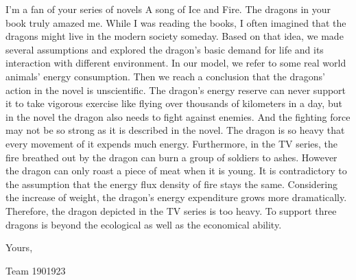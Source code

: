 \documentclass{mcmthesis}
\begin{document}
I’m a fan of your series of novels A song of Ice and Fire. The dragons in your book truly amazed me. While I was reading the books, I often imagined that the dragons might live in the modern society someday. Based on that idea, we made several assumptions and explored the dragon’s basic demand for life and its interaction with different environment. 
In our model, we refer to some real world animals’ energy consumption. Then we reach a conclusion that the dragons’ action in the novel is unscientific. The dragon’s energy reserve can never support it to take vigorous exercise like flying over thousands of kilometers in a day, but in the novel the dragon also needs to fight against enemies. And the fighting force may not be so strong as it is described in the novel. The dragon is so heavy that every movement of it expends much energy. Furthermore, in the TV series, the fire breathed out by the dragon can burn a group of soldiers to ashes. However the dragon can only roast a piece of meat when it is young. It is contradictory to the assumption that the energy flux density of fire stays the same. Considering the increase of weight, the dragon’s energy expenditure grows more dramatically. Therefore, the dragon depicted in the TV series is too heavy. To support three dragons is beyond the ecological as well as the  economical ability.

Yours,

Team 1901923



\end{document}
